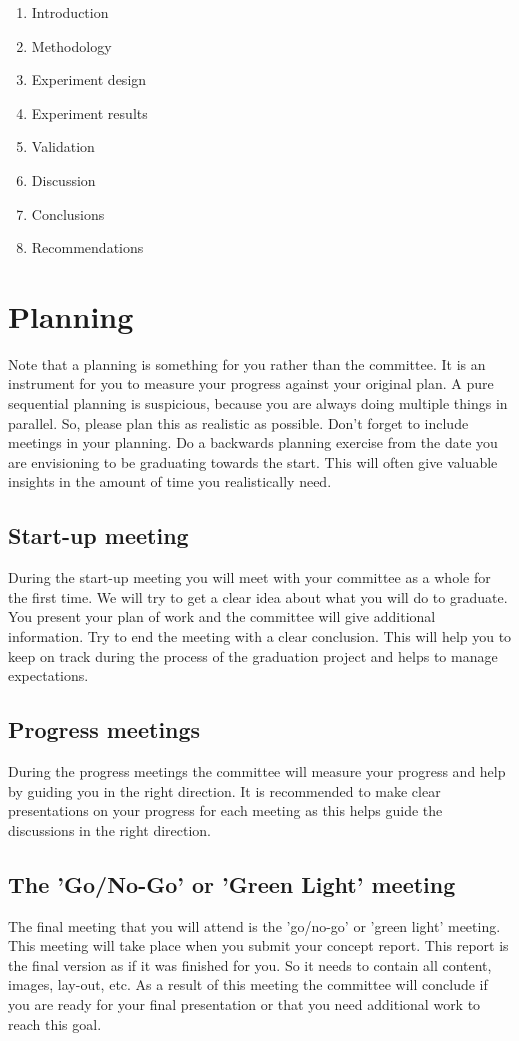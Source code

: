 \documentclass{latex-format/stylesheets/BEMNextstyle}
\begin{document}
\begin{enumerate}
\item Introduction
\item Methodology
\item Experiment design
\item Experiment results
\item Validation
\item Discussion
\item Conclusions
\item Recommendations
\end{enumerate}

\section*{Planning}
\label{sec:planning}
Note that a planning is something for you rather than the committee. It is an instrument for you to measure your progress against your original plan. A pure sequential planning is suspicious, because you are always doing multiple things in parallel. So, please plan this as realistic as possible. Don't forget to include meetings in your planning. Do a backwards planning exercise from the date you are envisioning to be graduating towards the start. This will often give valuable insights in the amount of time you realistically need.

\subsection*{Start-up meeting}
During the start-up meeting you will meet with your committee as a whole for the first time. We will try to get a clear idea about what you will do to graduate. You present your plan of work and the committee will give additional information. Try to end the meeting with a clear conclusion. This will help you to keep on track during the process of the graduation project and helps to manage expectations.

\subsection*{Progress meetings}
During the progress meetings the committee will measure your progress and help by guiding you in the right direction. It is recommended to make clear presentations on your progress for each meeting as this helps guide the discussions in the right direction.

\subsection*{The 'Go/No-Go' or 'Green Light' meeting}
The final meeting that you will attend is the 'go/no-go' or 'green light' meeting. This meeting will take place when you submit your concept report. This report is the final version as if it was finished for you. So it needs to contain all content, images, lay-out, etc. As a result of this meeting the committee will conclude if you are ready for your final presentation or that you need additional work to reach this goal.
\end{document}
